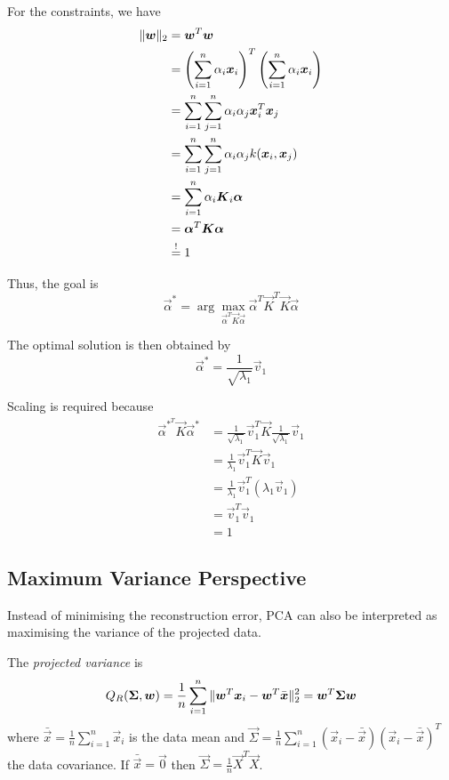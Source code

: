 For the constraints, we have
\begin{align*}
\lVert\boldsymbol{w}\rVert_2 &= \boldsymbol{w}^T \boldsymbol{w} \\
&= \left(\sum_{i=1}^n{\alpha_i \boldsymbol{x}_i}\right)^T
\left(\sum_{i=1}^n{\alpha_i \boldsymbol{x}_i}\right) \\
&= \sum_{i=1}^n{
	\sum_{j=1}^n{
		\alpha_i \alpha_j \boldsymbol{x}_i^T \boldsymbol{x}_j
	}
} \\
&= \sum_{i=1}^n{
	\sum_{j=1}^n{
		\alpha_i \alpha_j k(\boldsymbol{x}_i, \boldsymbol{x}_j)
	}
} \\
&= \sum_{i=1}^n{
	\alpha_i \boldsymbol{K}_i \boldsymbol{\alpha}
} \\
&= \boldsymbol{\alpha}^T \boldsymbol{K} \boldsymbol{\alpha} \\
&\overset{!}{=} 1
\end{align*}

Thus, the goal is
\begin{equation*}
\vec{\alpha}^* = 
\arg\max_{\vec{\alpha}^T \vec{K} \vec{\alpha}}{
	\vec{\alpha}^T \vec{K}^T \vec{K} \vec{\alpha}
}
\end{equation*}

The optimal solution is then obtained by
\begin{equation*}
\vec{\alpha}^* =
\frac{1}{\sqrt{\lambda_1}} \vec{v}_1
\end{equation*}

Scaling is required because
\begin{align*}
\vec{\alpha}^{*^T} \vec{K} \vec{\alpha}^* &=
\frac{1}{\sqrt{\lambda_1}} \vec{v}_1^T
\vec{K}
\frac{1}{\sqrt{\lambda_1}} \vec{v}_1 \\
&= \frac{1}{\lambda_1} \vec{v}_1^T \vec{K} \vec{v}_1 \\
&= \frac{1}{\lambda_1} \vec{v}_1^T (\lambda_1 \vec{v}_1) \\
&= \vec{v}_1^T \vec{v}_1 \\
&= 1
\end{align*}


\subsection{Maximum Variance Perspective}
Instead of minimising the reconstruction error,
PCA can also be interpreted as maximising the
variance of the projected data.

The \emph{projected variance} is
\begin{equation*}
Q_R(\boldsymbol{\Sigma}, \boldsymbol{w}) =
\frac{1}{n} \sum_{i=1}^n{\lVert
		\boldsymbol{w}^T \boldsymbol{x}_i - \boldsymbol{w}^T \bar{\boldsymbol{x}}
	\rVert_2^2}
= \boldsymbol{w}^T \boldsymbol{\Sigma} \boldsymbol{w}
\end{equation*}
where $\bar{\vec{x}} = \frac{1}{n} \sum_{i=1}^n{\vec{x}_i}$
is the data mean and
$\vec{\Sigma} = \frac{1}{n}\sum_{i=1}^n{(\vec{x}_i - \bar{\vec{x}}) (\vec{x}_i - \bar{\vec{x}})^T}$
the data covariance.
If $\bar{\vec{x}} = \vec{0}$ then
$\vec{\Sigma} = \frac{1}{n} \vec{X}^T \vec{X}$.

